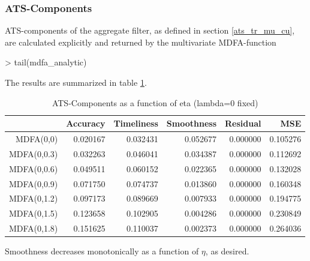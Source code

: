 \documentclass[a4paper]{book}
\begin{document}
\subsubsection{ATS-Components}

ATS-components of the aggregate filter, as defined in section \ref{ats_tr_mu_cu}, are calculated explicitly and returned by the multivariate MDFA-function
\begin{Schunk}
\begin{Sinput}
> tail(mdfa_analytic)
\end{Sinput}
\begin{Soutput}
175         2), NA)                                                                           
176     return(list(b = b, trffkt = trffkt, rever = rever, degrees_freedom = degrees_freedom, 
177         aic = aic, freezed_degrees = freezed_degrees, Accuracy = Accuracy,                
178         Smoothness = Smoothness, Timeliness = Timeliness, MS_error = MS_error,            
179         freezed_degrees_new = freezed_degrees_new))                                       
180 }                                                                                         
\end{Soutput}
\end{Schunk}
The results are summarized in table \ref{ats_comp_mdfa_S}.
\begin{table}[ht]
\centering
\begin{tabular}{rrrrrr}
  \hline
 & Accuracy & Timeliness & Smoothness & Residual & MSE \\ 
  \hline
MDFA(0,0) & 0.020167 & 0.032431 & 0.052677 & 0.000000 & 0.105276 \\ 
  MDFA(0,0.3) & 0.032263 & 0.046041 & 0.034387 & 0.000000 & 0.112692 \\ 
  MDFA(0,0.6) & 0.049511 & 0.060152 & 0.022365 & 0.000000 & 0.132028 \\ 
  MDFA(0,0.9) & 0.071750 & 0.074737 & 0.013860 & 0.000000 & 0.160348 \\ 
  MDFA(0,1.2) & 0.097173 & 0.089669 & 0.007933 & 0.000000 & 0.194775 \\ 
  MDFA(0,1.5) & 0.123658 & 0.102905 & 0.004286 & 0.000000 & 0.230849 \\ 
  MDFA(0,1.8) & 0.151625 & 0.110037 & 0.002373 & 0.000000 & 0.264036 \\ 
   \hline
\end{tabular}
\caption{ATS-Components as a function of eta (lambda=0 fixed)} 
\label{ats_comp_mdfa_S}
\end{table}Smoothness decreases  monotonically as a function of $\eta$, as desired.
\end{document}
